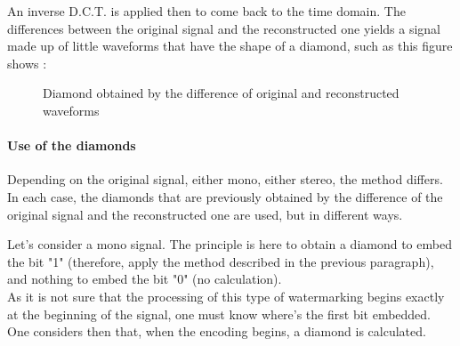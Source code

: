 An inverse D.C.T. is applied then to come back to the time domain. The differences between the original signal and the reconstructed one yields a signal made up of little waveforms that have the shape of a diamond, such as this figure shows :
\begin{figure}[H]
\caption{\label{diamond} Diamond obtained by the difference of original and reconstructed waveforms}
\end{figure}

\paragraph{Use of the diamonds}
Depending on the original signal, either mono, either stereo, the method differs. In each case, the diamonds that are previously obtained by the difference of the original signal and the reconstructed one are used, but in different ways.

Let's consider a mono signal. The principle is here to obtain a diamond to embed the bit "1" (therefore, apply the method described in the previous paragraph), and nothing to embed the bit "0" (no calculation).\\
As it is not sure that the processing of this type of watermarking begins exactly at the beginning of the signal, one must know where's the first bit embedded. One considers then that, when the encoding begins, a diamond is calculated.

